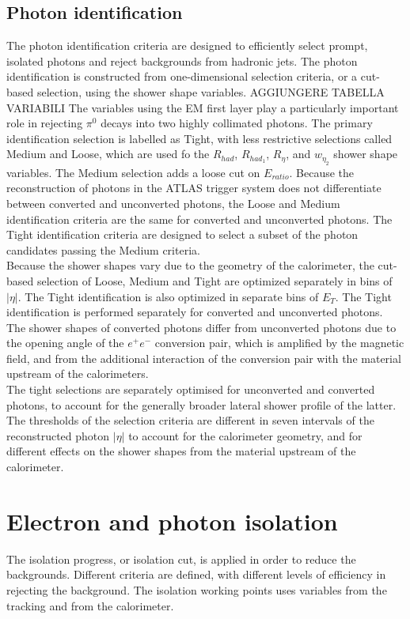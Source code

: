 \documentclass[a4paper, oneside]{book}
\begin{document}
			\subsection{Photon identification}
			\cite{El ph reco}The photon identification criteria are designed to efficiently select prompt, isolated photons and reject backgrounds from hadronic jets. The photon identification is constructed from one-dimensional
			selection criteria, or a cut-based selection, using the shower shape variables. AGGIUNGERE TABELLA VARIABILI
			The variables using the EM first layer play a particularly important role in rejecting $\pi^0$ decays into
			two highly collimated photons. The primary identification selection is labelled as Tight, with less restrictive selections called
			Medium and Loose, which are used fo the $R_{had}$, $R_{had_1}$, $R_{\eta}$, and $w_{\eta_2}$ shower shape variables. The Medium selection adds a loose cut on $E_{ratio}$. Because the reconstruction of photons in the ATLAS trigger system does not differentiate between converted and unconverted photons, the Loose and Medium identification criteria are the same for converted
			and unconverted photons. The Tight identification criteria are designed to select a subset of the photon candidates passing the Medium criteria.\\
			Because the shower shapes vary due to the geometry of the calorimeter, the cut-based selection of Loose, Medium and Tight
			are optimized separately in bins of $|\eta|$. The Tight identification is also optimized in separate bins of $E_T$. The Tight identification is performed separately for converted and
			unconverted photons. The shower shapes of converted photons differ from unconverted photons due to the opening angle of the $e^{+}e^{-}$ conversion pair, which is amplified by the magnetic field, and from the additional interaction of the conversion pair with the material upstream of the calorimeters. \\
			The tight selections are separately optimised for unconverted and converted photons, to account for the generally broader lateral shower profile of the latter. The thresholds of the selection criteria are different in seven intervals of the reconstructed photon $|\eta|$ to account for the calorimeter geometry, and for different effects on the shower shapes from the material upstream of the calorimeter.
			
		\section{Electron and photon isolation}
		The isolation progress, or isolation cut, is applied in order to reduce the backgrounds. Different criteria are defined, with different levels
		of efficiency in rejecting the background. The isolation working points uses variables from the tracking and from the calorimeter.
		
\end{document}
